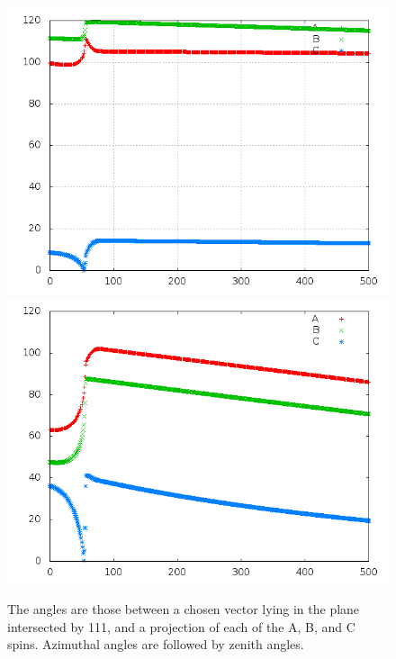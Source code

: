 \documentclass{article}
\begin{document}
\begin{figure}
\centering
\includegraphics[scale=0.5]{azim000to005.png}
\includegraphics[scale=0.5]{zen000to005.png}
\caption{The angles are those between a chosen vector lying in the plane intersected by 111,
and a projection of each of the A, B, and C spins. Azimuthal angles are followed by zenith angles.}
\end{figure}
\pagebreak
\end{document}
